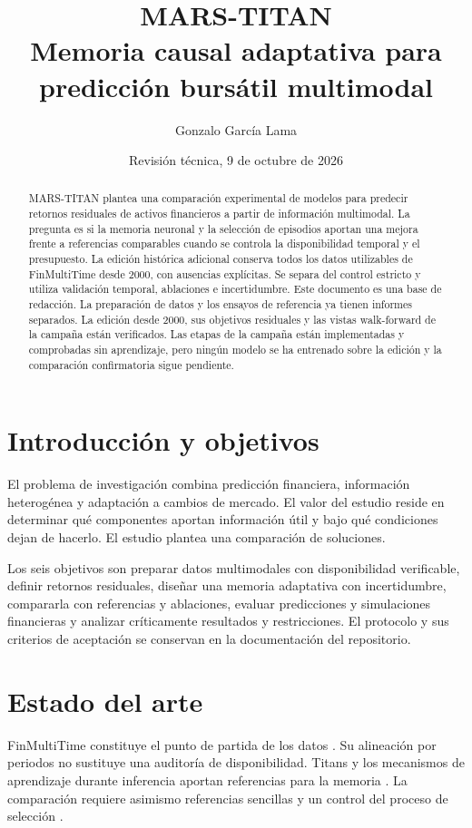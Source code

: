 \documentclass[11pt,a4paper]{report}
\title{MARS-TITAN\\\large Memoria causal adaptativa para predicción bursátil multimodal}
\author{Gonzalo García Lama}
\date{Revisión técnica, 9 de octubre de 2026}
\begin{document}
\maketitle
\begin{abstract}
MARS-TITAN plantea una comparación experimental de modelos para predecir
retornos residuales de activos financieros a partir de información multimodal.
La pregunta es si la memoria neuronal y la selección de episodios aportan una
mejora frente a referencias comparables cuando se controla la disponibilidad
temporal y el presupuesto. La edición histórica adicional conserva todos los
datos utilizables de FinMultiTime desde 2000, con ausencias explícitas. Se separa
del control estricto y utiliza validación temporal, ablaciones e incertidumbre.
Este documento es una base de redacción. La preparación de datos y los ensayos
de referencia ya tienen informes separados. La edición desde 2000, sus
objetivos residuales y las vistas walk-forward de la campaña están
verificados. Las etapas de la campaña están implementadas y comprobadas sin
aprendizaje, pero ningún modelo se ha entrenado sobre la edición y la
comparación confirmatoria sigue pendiente.
\end{abstract}
\tableofcontents

\chapter{Introducción y objetivos}
El problema de investigación combina predicción financiera, información
heterogénea y adaptación a cambios de mercado. El valor del estudio reside en
determinar qué componentes aportan información útil y bajo qué condiciones
dejan de hacerlo. El estudio plantea una comparación de soluciones.

Los seis objetivos son preparar datos multimodales con disponibilidad verificable,
definir retornos residuales, diseñar una memoria adaptativa con incertidumbre,
compararla con referencias y ablaciones, evaluar predicciones y simulaciones
financieras y analizar críticamente resultados y restricciones. El protocolo y
sus criterios de aceptación se conservan en la documentación del repositorio.

\chapter{Estado del arte}
FinMultiTime constituye el punto de partida de los datos
\parencite{xu2025finmultitime}. Su alineación por periodos no sustituye una auditoría
de disponibilidad. Titans y los mecanismos de aprendizaje durante inferencia
aportan referencias para la memoria \parencite{behrouz2025titans,sun2025ttt}.
La comparación requiere asimismo referencias sencillas y un control del proceso
de selección \parencite{zeng2023dlinear,bailey2017pbo}.
\end{document}
